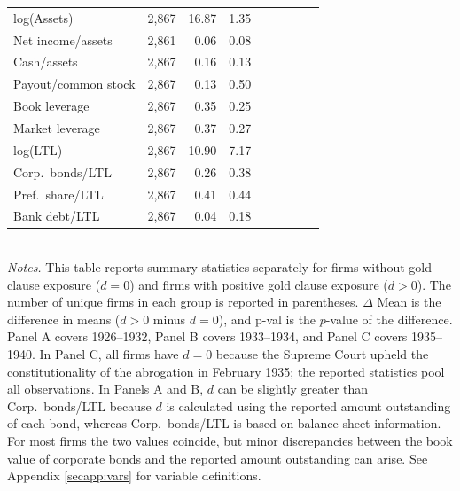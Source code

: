 \begin{table}[p]
\begin{threeparttable}
\begin{tabular}{l rrr rrr rr}
            log(Assets) & 2,867 & 16.87 & 1.35 &  &  &  &  &  \\
            Net income/assets & 2,861 & 0.06 & 0.08 &  &  &  &  &  \\
            Cash/assets & 2,867 & 0.16 & 0.13 &  &  &  &  &  \\
            Payout/common stock & 2,867 & 0.13 & 0.50 &  &  &  &  &  \\
            Book leverage & 2,867 & 0.35 & 0.25 &  &  &  &  &  \\
            Market leverage & 2,867 & 0.37 & 0.27 &  &  &  &  &  \\
            log(LTL) & 2,867 & 10.90 & 7.17 &  &  &  &  &  \\
            Corp.\ bonds/LTL & 2,867 & 0.26 & 0.38 &  &  &  &  &  \\
            Pref.\ share/LTL & 2,867 & 0.41 & 0.44 &  &  &  &  &  \\
            Bank debt/LTL & 2,867 & 0.04 & 0.18 &  &  &  &  &  \\
            \bottomrule
        \end{tabular}
    \end{threeparttable}\\
    
    \vspace*{3mm} \justifying \noindent
    \scriptsize{\textit{Notes.} This table reports summary statistics separately for firms without gold clause exposure ($d = 0$) and firms with positive gold clause exposure ($d > 0$). The number of unique firms in each group is reported in parentheses. $\Delta$ Mean is the difference in means ($d > 0$ minus $d = 0$), and p-val is the $p$-value of the difference. Panel A covers 1926--1932, Panel B covers 1933--1934, and Panel C covers 1935--1940. In Panel C, all firms have $d = 0$ because the Supreme Court upheld the constitutionality of the abrogation in February 1935; the reported statistics pool all observations. In Panels A and B, $d$ can be slightly greater than Corp.\ bonds/LTL because $d$ is calculated using the reported amount outstanding of each bond, whereas Corp.\ bonds/LTL is based on balance sheet information. For most firms the two values coincide, but minor discrepancies between the book value of corporate bonds and the reported amount outstanding can arise. See Appendix \ref{secapp:vars} for variable definitions.}
\end{table}
